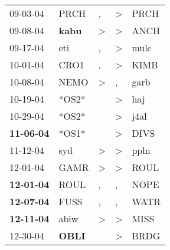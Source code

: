 \begin{supertabular}{p{0.07\textwidth}p{0.06\textwidth}p{0.02\textwidth}p{0.02\textwidth}p{0.06\textwidth}}
          09-03-04\textsuperscript{} &           PRCH\textsuperscript{} &                , &     \textgreater &           PRCH\textsuperscript{} \\
          09-08-04\textsuperscript{} &  \textbf{kabu\textsuperscript{}} &     \textgreater &     \textgreater &           ANCH\textsuperscript{} \\
          09-17-04\textsuperscript{} &            eti\textsuperscript{} &                , &     \textgreater &           mulc\textsuperscript{} \\
          10-01-04\textsuperscript{} &           CRO1\textsuperscript{} &                , &     \textgreater &           KIMB\textsuperscript{} \\
          10-08-04\textsuperscript{} &           NEMO\textsuperscript{} &     \textgreater &                , &           garb\textsuperscript{} \\
          10-19-04\textsuperscript{} &                            *OS2* &                  &     \textgreater &            haj\textsuperscript{} \\
          10-29-04\textsuperscript{} &                            *OS2* &                  &     \textgreater &           j4al\textsuperscript{} \\
 \textbf{11-06-04\textsuperscript{}} &                            *OS1* &                  &     \textgreater &           DIVS\textsuperscript{} \\
          11-12-04\textsuperscript{} &            syd\textsuperscript{} &     \textgreater &     \textgreater &           ppln\textsuperscript{} \\
          12-01-04\textsuperscript{} &           GAMR\textsuperscript{} &     \textgreater &     \textgreater &           ROUL\textsuperscript{} \\
 \textbf{12-01-04\textsuperscript{}} &           ROUL\textsuperscript{} &                , &                , &           NOPE\textsuperscript{} \\
 \textbf{12-07-04\textsuperscript{}} &           FUSS\textsuperscript{} &                , &                , &           WATR\textsuperscript{} \\
 \textbf{12-11-04\textsuperscript{}} &           abiw\textsuperscript{} &     \textgreater &     \textgreater &           MISS\textsuperscript{} \\
          12-30-04\textsuperscript{} &  \textbf{OBLI\textsuperscript{}} &                  &     \textgreater &           BRDG\textsuperscript{} \\

\end{supertabular}
